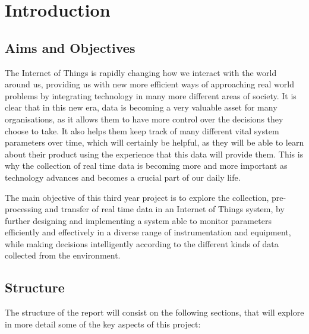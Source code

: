 \documentclass[12pt]{article}
\begin{document}
\tableofcontents
\newpage

\section{Introduction}

\subsection{Aims and Objectives}

The Internet of Things is rapidly changing how we interact with the world around us, providing us with new more efficient ways of approaching real world problems by integrating technology in many more different areas of society. It is clear that in this new era, data is becoming a very valuable asset for many organisations, as it allows them to have more control over the decisions they choose to take. It also helps them keep track of many different vital system parameters over time, which will certainly be helpful, as they will be able to learn about their product using the experience that this data will provide them. This is why the collection of real time data is becoming more and more important as technology advances and becomes a crucial part of our daily life.\par 

The main objective of this third year project is to explore the collection, pre-processing and transfer of real time data in an Internet of Things system, by further designing and implementing a system able to monitor parameters efficiently and effectively in a diverse range of instrumentation and equipment, while making decisions intelligently according to the different kinds of data collected from the environment. 

\subsection{Structure} 

The structure of the report will consist on the following sections, that will explore in more detail some of the key aspects of this project:
\end{document}

